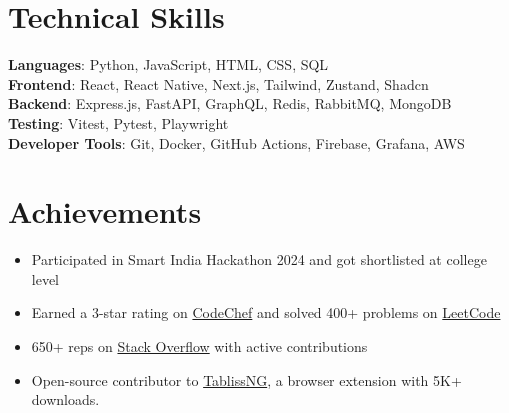 \documentclass[letterpaper,11pt]{article}
\begin{document}
\section{Technical Skills}
 \begin{itemize}[leftmargin=0.15in, label={}]
    \small{\item{
     \textbf{Languages}{: Python, JavaScript, HTML, CSS, SQL} \\
     \textbf{Frontend}{: React, React Native, Next.js, Tailwind, Zustand, Shadcn} \\
    \textbf{Backend}{: Express.js, FastAPI, GraphQL, Redis, RabbitMQ, MongoDB} \\
    \textbf{Testing}{: Vitest, Pytest, Playwright} \\
     \textbf{Developer Tools}{: Git, Docker, GitHub Actions, Firebase, Grafana, AWS }
    }}
 \end{itemize}

\section{Achievements}
\begin{itemize}[leftmargin=0.15in, itemsep=-5pt]
     \item \small{Participated in Smart India Hackathon 2024 and got shortlisted at college level}
    \item \small{Earned a 3-star rating on \href{https://www.codechef.com/users/sbrjt}{CodeChef} and solved 400+ problems on \href{https://leetcode.com/u/user1484IW/}{LeetCode}}
    \item \small{650+ reps on \href{https://stackoverflow.com/users/14313852/shub}{Stack Overflow} with active contributions}
     \item \small{Open-source contributor to \href{https://github.com/BookCatKid/TablissNG/issues?q=author:sbrjt%20is:pr}{TablissNG}, a browser extension with 5K+ downloads.}
\end{itemize}


\end{document}

